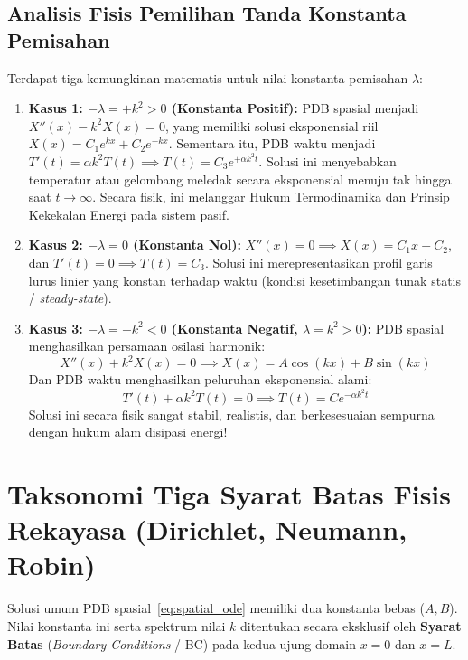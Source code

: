 \documentclass[11pt,a4paper]{article}
\theoremstyle{definition}
\begin{document}
\subsection{Analisis Fisis Pemilihan Tanda Konstanta Pemisahan}
Terdapat tiga kemungkinan matematis untuk nilai konstanta pemisahan $\lambda$:
\begin{enumerate}[leftmargin=*]
    \item \textbf{Kasus 1: $-\lambda = +k^2 > 0$ (Konstanta Positif):}
    PDB spasial menjadi $X''(x) - k^2 X(x) = 0$, yang memiliki solusi eksponensial riil $X(x) = C_1 e^{kx} + C_2 e^{-kx}$. Sementara itu, PDB waktu menjadi $T'(t) = \alpha k^2 T(t) \implies T(t) = C_3 e^{+\alpha k^2 t}$.
    Solusi ini menyebabkan temperatur atau gelombang meledak secara eksponensial menuju tak hingga saat $t \to \infty$. Secara fisik, ini melanggar Hukum Termodinamika dan Prinsip Kekekalan Energi pada sistem pasif.
    
    \item \textbf{Kasus 2: $-\lambda = 0$ (Konstanta Nol):}
    $X''(x) = 0 \implies X(x) = C_1 x + C_2$, dan $T'(t) = 0 \implies T(t) = C_3$.
    Solusi ini merepresentasikan profil garis lurus linier yang konstan terhadap waktu (kondisi kesetimbangan tunak statis / \textit{steady-state}).
    
    \item \textbf{Kasus 3: $-\lambda = -k^2 < 0$ (Konstanta Negatif, $\lambda = k^2 > 0$):}
    PDB spasial menghasilkan persamaan osilasi harmonik:
    \begin{equation}
        X''(x) + k^2 X(x) = 0 \implies X(x) = A \cos(kx) + B \sin(kx)
        \label{eq:spatial_ode}
    \end{equation}
    Dan PDB waktu menghasilkan peluruhan eksponensial alami:
    \begin{equation}
        T'(t) + \alpha k^2 T(t) = 0 \implies T(t) = C e^{-\alpha k^2 t}
        \label{eq:temporal_ode}
    \end{equation}
    Solusi ini secara fisik sangat stabil, realistis, dan berkesesuaian sempurna dengan hukum alam disipasi energi!
\end{enumerate}

\section{Taksonomi Tiga Syarat Batas Fisis Rekayasa (Dirichlet, Neumann, Robin)}

Solusi umum PDB spasial~\eqref{eq:spatial_ode} memiliki dua konstanta bebas ($A, B$). Nilai konstanta ini serta spektrum nilai $k$ ditentukan secara eksklusif oleh \textbf{Syarat Batas} (\textit{Boundary Conditions} / BC) pada kedua ujung domain $x = 0$ dan $x = L$.
\end{document}
